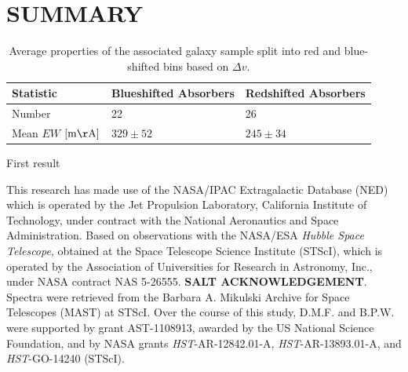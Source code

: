 \documentclass[iop]{emulateapj-rtx4}
\begin{document}
\section{SUMMARY}



\begin{table}[ht]\footnotesize
\begin{center}
\begin{tabular}{l l l}
 \hline \hline
 Statistic                				&  Blueshifted Absorbers   &     Redshifted Absorbers     \\ 
  \hline \hline
 Number 	          			 		&     	22				&	26			\\
 Mean $EW$    \scriptsize $\rm [m\AA]$    &	$329 \pm 52$ 		&	$245 \pm 34$  	\\
  
\hline
\end{tabular}
\end{center}
  \caption{\small{Average properties of the associated galaxy sample split into red and blue-shifted bins based on $\Delta v$.}}
  \label{resultsTable}
\end{table}


\vspace{10pt}

\indent \textbullet \indent First result


\acknowledgements

This research has made use of the NASA/IPAC Extragalactic Database (NED) which is operated by the Jet Propulsion Laboratory, California Institute of Technology, under contract with the National Aeronautics and Space Administration. Based on observations with the NASA/ESA \textit{Hubble Space Telescope}, obtained at the Space Telescope Science Institute (STScI), which is operated by the Association of Universities for Research in Astronomy, Inc., under NASA contract NAS 5-26555. \textbf{SALT ACKNOWLEDGEMENT}. Spectra were retrieved from the Barbara A. Mikulski Archive for Space Telescopes (MAST) at STScI. Over the course of this study, D.M.F. and B.P.W. were supported by grant AST-1108913, awarded by the US National Science Foundation, and by NASA grants \textit{HST}-AR-12842.01-A, \textit{HST}-AR-13893.01-A, and \textit{HST}-GO-14240 (STScI). 



\nocite{*}


\end{document}
